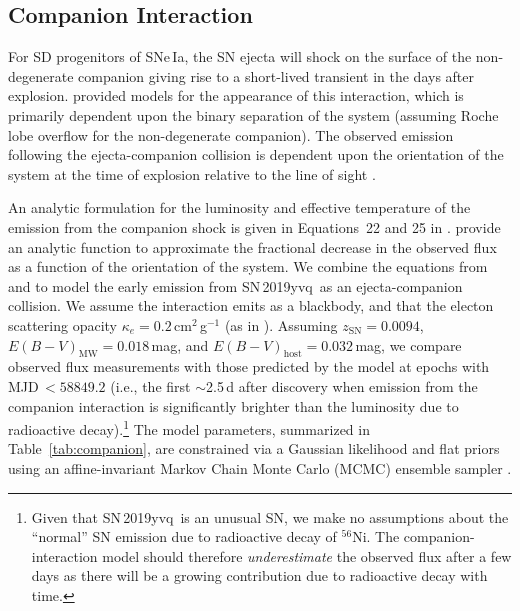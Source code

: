 \documentclass[twocolumn]{aastex63}
\newcommand{\radni}{$^{56}$Ni}
\newcommand{\sn}{SN\,2019yvq}
\begin{document}
\subsection{Companion Interaction}\label{sec:companion_interaction}

For SD progenitors of SNe\,Ia, the SN ejecta will shock on the surface of the
non-degenerate companion giving rise to a short-lived transient in the days
after explosion. \citet{Kasen10a} provided models for the appearance of this
interaction, which is primarily dependent upon the binary separation of the
system (assuming Roche lobe overflow for the non-degenerate companion). The
observed emission following the ejecta-companion collision is dependent upon
the orientation of the system at the time of explosion relative to the line of
sight \citep{Kasen10a}.

An analytic formulation for the luminosity and effective temperature of the
emission from the companion shock is given in Equations~22 and 25 in
\citet{Kasen10a}. \citet{Brown12} provide an analytic function to approximate
the fractional decrease in the observed flux as a function of the orientation
of the system. We combine the equations from \citet{Kasen10a} and
\citet{Brown12} to model the early emission from \sn\ as an ejecta-companion
collision. We assume the interaction emits as a blackbody, and that the
electon scattering opacity $\kappa_e = 0.2$\,cm$^{2}$\,g$^{-1}$ (as in
\citealt{Kasen10a}). Assuming $z_\mathrm{SN} = 0.0094$, $E(B-V)_\mathrm{MW} =
0.018$\,mag, and $E(B-V)_\mathrm{host} = 0.032$\,mag, we compare observed flux
measurements with those predicted by the \citet{Kasen10a} model at epochs with
MJD$\,< 58849.2$ (i.e., the first $\sim$2.5\,d after discovery when emission
from the companion interaction is significantly brighter than the luminosity
due to radioactive decay).\footnote{Given that \sn\ is an unusual SN, we make
no assumptions about the ``normal'' SN emission due to radioactive decay of
\radni. The companion-interaction model should therefore
\textit{underestimate} the observed flux after a few days as there will be a
growing contribution due to radioactive decay with time.} The model
parameters, summarized in Table~\ref{tab:companion}, are constrained via a
Gaussian likelihood and flat priors using an affine-invariant
\citep{Goodman10} Markov Chain Monte Carlo (MCMC) ensemble sampler
\citep{Foreman-Mackey13}.


\end{document}
